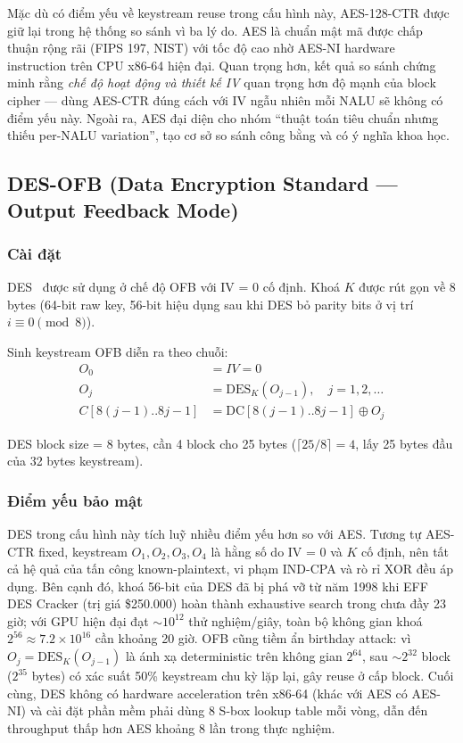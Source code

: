 Mặc dù có điểm yếu về keystream reuse trong cấu hình này, AES-128-CTR được giữ lại trong hệ thống so sánh vì ba lý do. AES là chuẩn mật mã được chấp thuận rộng rãi (FIPS 197, NIST) với tốc độ cao nhờ AES-NI hardware instruction trên CPU x86-64 hiện đại. Quan trọng hơn, kết quả so sánh chứng minh rằng \emph{chế độ hoạt động và thiết kế IV} quan trọng hơn độ mạnh của block cipher --- dùng AES-CTR đúng cách với IV ngẫu nhiên mỗi NALU sẽ không có điểm yếu này. Ngoài ra, AES đại diện cho nhóm ``thuật toán tiêu chuẩn nhưng thiếu per-NALU variation'', tạo cơ sở so sánh công bằng và có ý nghĩa khoa học.

\subsection{DES-OFB (Data Encryption Standard --- Output Feedback Mode)}

\subsubsection{Cài đặt}

DES~\cite{fips_des} được sử dụng ở chế độ OFB với IV = 0 cố định. Khoá $K$ được rút gọn về 8 bytes (64-bit raw key, 56-bit hiệu dụng sau khi DES bỏ parity bits ở vị trí $i \equiv 0 \pmod{8}$).

Sinh keystream OFB diễn ra theo chuỗi:
\begin{align}
O_0 &= IV = 0 \\
O_j &= \text{DES}_K(O_{j-1}), \quad j = 1, 2, \ldots \\
C[8(j-1)..8j-1] &= \text{DC}[8(j-1)..8j-1] \oplus O_j
\end{align}

DES block size = 8 bytes, cần 4 block cho 25 bytes ($\lceil 25/8 \rceil = 4$, lấy 25 bytes đầu của 32 bytes keystream).

\subsubsection{Điểm yếu bảo mật}

DES trong cấu hình này tích luỹ nhiều điểm yếu hơn so với AES. Tương tự AES-CTR fixed, keystream $O_1, O_2, O_3, O_4$ là hằng số do IV = 0 và $K$ cố định, nên tất cả hệ quả của tấn công known-plaintext, vi phạm IND-CPA và rò rỉ XOR đều áp dụng. Bên cạnh đó, khoá 56-bit của DES đã bị phá vỡ từ năm 1998 khi EFF DES Cracker (trị giá \$250.000) hoàn thành exhaustive search trong chưa đầy 23 giờ; với GPU hiện đại đạt $\sim10^{12}$ thử nghiệm/giây, toàn bộ không gian khoá $2^{56} \approx 7.2 \times 10^{16}$ cần khoảng 20 giờ. OFB cũng tiềm ẩn birthday attack: vì $O_j = \text{DES}_K(O_{j-1})$ là ánh xạ deterministic trên không gian $2^{64}$, sau $\sim 2^{32}$ block ($2^{35}$ bytes) có xác suất 50\% keystream chu kỳ lặp lại, gây reuse ở cấp block. Cuối cùng, DES không có hardware acceleration trên x86-64 (khác với AES có AES-NI) và cài đặt phần mềm phải dùng 8 S-box lookup table mỗi vòng, dẫn đến throughput thấp hơn AES khoảng 8 lần trong thực nghiệm.

